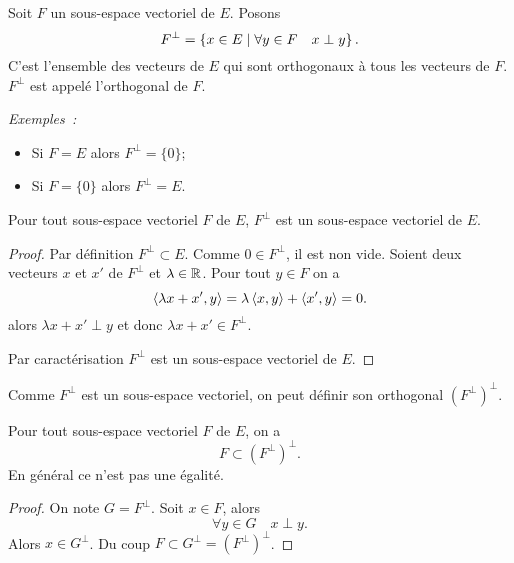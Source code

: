 \begin{defdef}
  Soit $F$ un sous-espace vectoriel de $E$. Posons
  \begin{equation}
    F^{\perp}=\left\{x \in E\mathrel{}\middle|\mathrel{}\forall y \in F \quad x \perp y\right\}.
  \end{equation}
  C'est l'ensemble des vecteurs de $E$ qui sont orthogonaux à tous les vecteurs de $F$. $F^{\perp}$ est appelé l'orthogonal de $F$.
\end{defdef}

\emph{Exemples~:}
\begin{itemize}
\item Si $F=E$ alors $F^{\perp}=\{0\}$;
\item Si $F=\{0\}$ alors $F^{\perp}=E$.
\end{itemize}

\begin{prop}
  Pour tout sous-espace vectoriel $F$ de $E$, $F^{\perp}$ est un sous-espace vectoriel de $E$.
\end{prop}
\begin{proof}
  Par définition $F^\perp \subset E$. Comme $0 \in F^\perp$, il est non vide. Soient deux vecteurs $x$ et $x'$ de $F^\perp$ et $\lambda \in \mathbb{R}$. Pour tout $y \in F$ on a
  \begin{equation}
    \left\langle{\lambda x+x'},{y}\right\rangle=\lambda \left\langle{x},{y}\right\rangle+\left\langle{x'},{y}\right\rangle=0.
  \end{equation}
  alors $\lambda x+x' \perp y$ et donc $\lambda x+x' \in F^\perp$.

  Par caractérisation $F^\perp$ est un sous-espace vectoriel de $E$.
\end{proof}

Comme $F^\perp$ est un sous-espace vectoriel, on peut définir son orthogonal $(F^\perp)^\perp$.

\begin{prop}
  Pour tout sous-espace vectoriel $F$ de $E$, on a
  \begin{equation}
    F \subset (F^\perp)^\perp.
  \end{equation}
  \danger En général ce n'est pas une égalité.
\end{prop}
\begin{proof}
  On note $G=F^\perp$. Soit $x \in F$, alors
  \begin{equation}
    \forall y \in G \quad x\perp y.
  \end{equation}
  Alors $x \in G^\perp$. Du coup $F \subset G^\perp=(F^\perp)^\perp$.
\end{proof}

